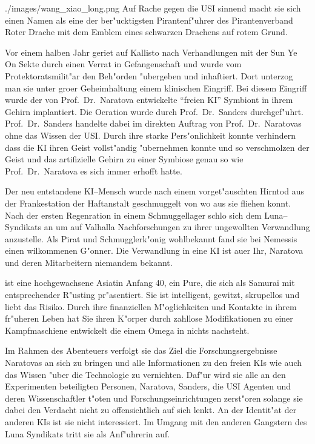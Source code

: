 \begin{sideimagebox}[r]{0.64}{./images/wang_xiao_long.png}{}
    Auf Rache gegen die USI sinnend macht sie sich einen Namen als eine der ber"ucktigsten Pirantenf"uhrer des Pirantenverband Roter Drache mit dem Emblem eines schwarzen Drachens auf rotem Grund.

    Vor einem halben Jahr geriet \xl{} auf Kallisto nach Verhandlungen mit der Sun Ye On Sekte durch einen Verrat in Gefangenschaft und wurde vom Protektoratsmilit"ar den Beh"orden "ubergeben und inhaftiert. Dort unterzog man sie unter gro\3er Geheimhaltung einem klinischen Eingriff. Bei diesem Eingriff wurde der von Prof.~Dr.~Naratova entwickelte ``freien KI'' Symbiont in ihrem Gehirn implantiert. Die Oeration wurde durch Prof.~Dr.~Sanders durchgef"uhrt. Prof.~Dr.~Sanders handelte dabei im direkten Auftrag von Prof.~Dr.~Naratovas ohne das Wissen der USI. Durch ihre starke Pers"onlichkeit konnte \xl{} verhindern dass die KI ihren Geist vollst"andig "ubernehmen konnte und so verschmolzen der Geist und das artifizielle Gehirn zu einer Symbiose genau so wie Prof.~Dr.~Naratova es sich immer erhofft hatte. 
\end{sideimagebox}

Der neu entstandene KI--Mensch wurde nach einem vorget"auschten Hirntod aus der Frankestation der Haftanstalt geschmuggelt von wo aus sie fliehen konnt. Nach der ersten Regenration in einem Schmuggellager schlo\3 sich \xl{} dem Luna--Syndikats an um auf Valhalla Nachforschungen zu ihrer ungewollten Verwandlung anzustelle. Als Pirat und Schmugglerk"onig wohlbekannt fand sie bei Nemessis einen wilkommenen G"onner. Die Verwandlung in eine KI ist au\3er Ihr, Naratova und deren Mitarbeitern niemandem bekannt.

\xl{} ist eine hochgewachsene Asiatin Anfang 40, ein Pure, die sich als Samurai mit entsprechender R"usting pr"asentiert. Sie ist intelligent, gewitzt, skrupellos und liebt das Risiko. Durch ihre finanziellen M"oglichkeiten und Kontakte in ihrem fr"uheren Leben hat Sie ihren K"orper durch zahllose Modifikationen zu einer Kampfmaschiene entwickelt die einem Omega in nichts nachsteht.

Im Rahmen des Abenteuers verfolgt sie das Ziel die Forschungsergebnisse Naratovas an sich zu bringen und alle Informationen zu den freien KIs wie auch das Wissen "uber die Technologie zu vernichten. Daf"ur wird sie alle an den Experimenten beteiligten Personen, Naratova, Sanders, die USI Agenten und deren Wissenschaftler t"oten und Forschungseinrichtungen zerst"oren solange sie dabei den Verdacht nicht zu offensichtlich auf sich lenkt. An der Identit"at der anderen KIs ist sie nicht interessiert. Im Umgang mit den anderen Gangstern des Luna Syndikats tritt sie als Anf"uhrerin auf.

